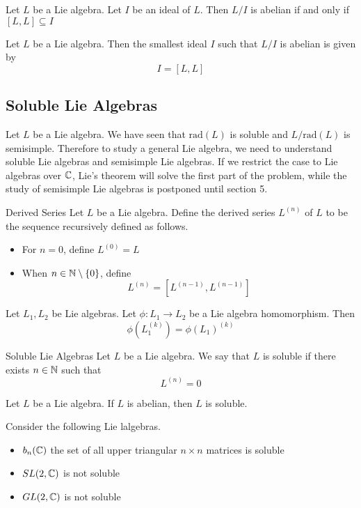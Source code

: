 \documentclass[a4paper]{article}
\begin{document}
\begin{lmm}{}{} Let $L$ be a Lie algebra. Let $I$ be an ideal of $L$. Then $L/I$ is abelian if and only if $[L,L]\subseteq I$
\end{lmm}

\begin{crl}{}{} Let $L$ be a Lie algebra. Then the smallest ideal $I$ such that $L/I$ is abelian is given by $$I=[L,L]$$
\end{crl}

\subsection{Soluble Lie Algebras}
Let $L$ be a Lie algebra. We have seen that $\text{rad}(L)$ is soluble and $L/\text{rad}(L)$ is semisimple. Therefore to study a general Lie algebra, we need to understand soluble Lie algebras and semisimple Lie algebras. If we restrict the case to Lie algebras over $\mathbb{C}$, Lie's theorem will solve the first part of the problem, while the study of semisimple Lie algebras is postponed until section 5. 

\begin{defn}{Derived Series}{} Let $L$ be a Lie algebra. Define the derived series $L^{(n)}$ of $L$ to be the sequence recursively defined as follows. 
\begin{itemize}
\item For $n=0$, define $L^{(0)}=L$
\item When $n\in\mathbb{N}\setminus\{0\}$, define $$L^{(n)}=[L^{(n-1)},L^{(n-1)}]$$
\end{itemize}
\end{defn}

\begin{lmm}{}{} Let $L_1,L_2$ be Lie algebras. Let $\phi:L_1\to L_2$ be a Lie algebra homomorphism. Then $$\phi(L_1^{(k)})=\phi(L_1)^{(k)}$$
\end{lmm}

\begin{defn}{Soluble Lie Algebras}{} Let $L$ be a Lie algebra. We say that $L$ is soluble if there exists $n\in\mathbb{N}$ such that $$L^{(n)}=0$$
\end{defn}

\begin{lmm}{}{} Let $L$ be a Lie algebra. If $L$ is abelian, then $L$ is soluble. 
\end{lmm}

\begin{eg}{}{} Consider the following Lie lalgebras. 
\begin{itemize}
\item $b_n(\mathbb{C})$ the set of all upper triangular $n\times n$ matrices is soluble
\item $SL(2,\mathbb{C})$ is not soluble
\item $GL(2,\mathbb{C})$ is not soluble
\end{itemize}
\end{eg}
\end{document}
